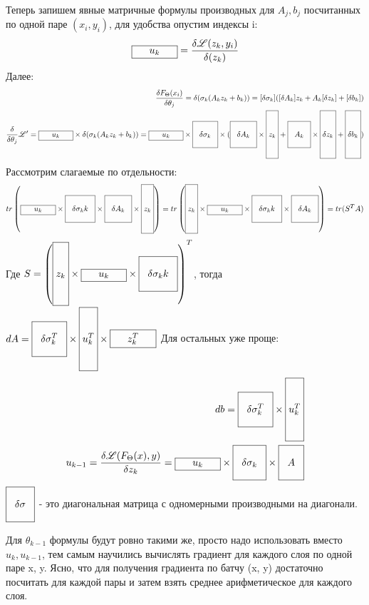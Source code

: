 \documentclass{article}
\newcommand{\Li}{\mathscr{L}}
\newcommand{\hh}[1]{\boxed{\rule[-0.9cm]{0cm}{2cm}#1}}
\newcommand{\llo}[1]{\boxed{\rule{0.5cm}{0cm}#1\rule{0.5cm}{0cm}}}
\newcommand{\mm}[1]{\boxed{\rule[-0.4cm]{0cm}{1cm}\rule{0.2cm}{0cm}#1\rule{0.2cm}{0cm}}}
\begin{document}
Теперь запишем явные матричные формулы производных для $A_j, b_j$ посчитанных по одной паре $(x_i, y_i)$, для удобства опустим индексы i:
\begin{align*}
    \llo{u_k} = \frac{\delta \Li(z_k, y_i)}{\delta(z_k)}
\end{align*}
Далее:
\begin{align*}
    \frac{\delta F_{\Theta}(x_i)}{\delta \theta_j} = \delta(\sigma_k(A_k z_{k} + b_k)) = [\delta\sigma_k]([\delta A_k]z_{k} + A_k[\delta z_{k}] + [\delta b_k])\\
    \frac{\delta}{\delta \theta_j}\Li' = \llo{u_k} \times \delta(\sigma_k(A_k z_{k} + b_k)) =
    \llo{u_k}\times \mm{\delta\sigma_k} \times (\mm{\delta A_k} \times \hh{z_{k}}
    + \mm{A_k} \times \hh{\delta z_{k}} + \hh{\delta b_k})
\end{align*}
Рассмотрим слагаемые по отдельности:\\
\begin{align*}
    tr\left(\llo{u_k} \times \mm{\delta\sigma_kk}\times\mm{\delta A_k}\times\hh{z_{k}}\right) = 
    tr\left(\hh{z_{k}}\times \llo{u_k} \times \mm{\delta\sigma_kk}\times\mm{\delta A_k}\right) = 
    tr(S^T A)
\end{align*}
Где $S = \left(\hh{z_{k}}\times \llo{u_k} \times \mm{\delta\sigma_kk}\right)^T$, тогда 
$
    dA = \mm{\delta\sigma_k^T} \times \hh{u_k^T} \times \llo{z_{k}^T}
$
Для остальных уже проще:\\
\begin{align*}
    d b = \mm{\delta\sigma_k^T} \times \hh{u_k^T}\\
    u_{k-1} = \frac{\delta \Li(F_{\Theta}(x), y)}{\delta z_{k}} = \llo{u_k}\times\mm{\delta \sigma_k} \times \mm{A}
\end{align*}
$\mm{\delta \sigma}$ - это диагональная матрица с одномерными производными на диагонали.

Для $\theta_{k-1}$ формулы будут ровно такими же, просто надо использовать вместо $u_k, u_{k-1}$, тем самым научились вычислять 
градиент для каждого слоя по одной паре x, y. Ясно, что для получения градиента по батчу (x, y) достаточно посчитать для каждой пары и затем 
взять среднее арифметическое для каждого слоя.

\end{document}
